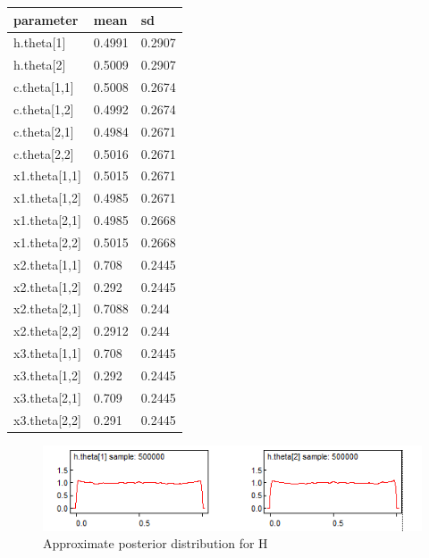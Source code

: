 \documentclass[12pt]{article} %
\begin{document}
\begin{table}[h!]
\centering
\begin{tabu} to 0.8\textwidth { | X[l] | X[l] | X[l] | }
 \hline
 parameter & mean & sd \\
 \hline
 h.theta[1] & 0.4991 & 0.2907 \\
 \hline
 h.theta[2] & 0.5009  & 0.2907 \\
 \hline
 c.theta[1,1] & 0.5008 & 0.2674 \\
 \hline
 c.theta[1,2] & 0.4992  & 0.2674 \\
  \hline
 c.theta[2,1] & 0.4984  & 0.2671 \\
  \hline
 c.theta[2,2] & 0.5016  & 0.2671 \\
 \hline
 x1.theta[1,1] & 0.5015 & 0.2671 \\
 \hline
 x1.theta[1,2] & 0.4985  & 0.2671 \\
  \hline
 x1.theta[2,1] & 0.4985  & 0.2668 \\
  \hline
 x1.theta[2,2] & 0.5015  & 0.2668 \\
 \hline
 x2.theta[1,1] & 0.708 & 0.2445 \\
 \hline
 x2.theta[1,2] & 0.292  & 0.2445 \\
  \hline
 x2.theta[2,1] & 0.7088  & 0.244 \\
  \hline
 x2.theta[2,2] & 0.2912  & 0.244 \\
 \hline
 x3.theta[1,1] & 0.708 & 0.2445 \\
 \hline
 x3.theta[1,2] & 0.292  & 0.2445 \\
  \hline
 x3.theta[2,1] & 0.709  & 0.2445 \\
  \hline
 x3.theta[2,2] & 0.291  & 0.2445 \\
\hline
\end{tabu}
\end{table}

\begin{figure}[h!]
  \centering
  \includegraphics[width=\linewidth]{bugs_graphs/h.png}
  \caption{Approximate posterior distribution for H}
  \label{fig:H Posterior}
\end{figure}
\end{document}
